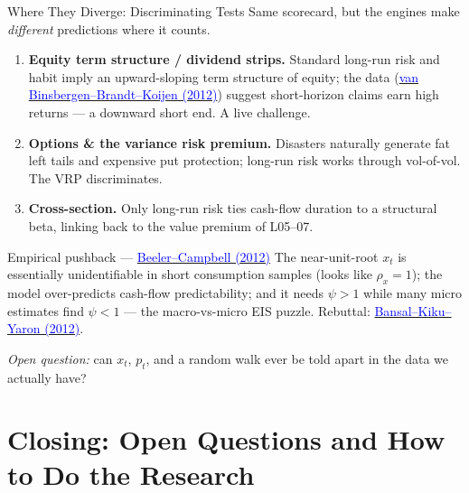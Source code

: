 \documentclass{beamer}
\begin{document}
\begin{frame}{Where They Diverge: Discriminating Tests}
\justifying
Same scorecard, but the engines make \emph{different} predictions where it counts.
\begin{enumerate}\small
\item \textbf{Equity term structure / dividend strips.} Standard long-run risk and habit imply an \alert{upward}-sloping term structure of equity; the data (\href{https://doi.org/10.1257/aer.102.4.1596}{\textcolor{blue}{van Binsbergen--Brandt--Koijen (2012)}}) suggest short-horizon claims earn high returns --- a \alert{downward} short end. A live challenge.
\item \textbf{Options \& the variance risk premium.} Disasters naturally generate fat left tails and expensive put protection; long-run risk works through vol-of-vol. The VRP discriminates.
\item \textbf{Cross-section.} Only long-run risk ties cash-flow \alert{duration} to a structural beta, linking back to the value premium of L05--07.
\end{enumerate}
\begin{block}{Empirical pushback --- \href{https://doi.org/10.1561/104.00000004}{\textcolor{blue}{Beeler--Campbell (2012)}}}
The near-unit-root $x_t$ is essentially \alert{unidentifiable} in short consumption samples (looks like $\rho_x=1$); the model over-predicts cash-flow predictability; and it needs $\psi>1$ while many micro estimates find $\psi<1$ --- the macro-vs-micro EIS puzzle. Rebuttal: \href{https://doi.org/10.1561/104.00000005}{\textcolor{blue}{Bansal--Kiku--Yaron (2012)}}.
\end{block}
\centerline{\small \textit{Open question:} can $x_t$, $p_t$, and a random walk ever be told apart in the data we actually have?}
\end{frame}

\section{Closing: Open Questions and How to Do the Research}
\end{document}
